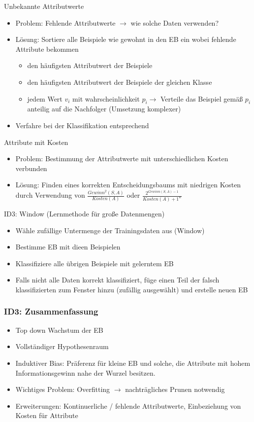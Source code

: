 \documentclass[paper=a4, fontsize=11pt]{scrartcl} %
\numberwithin{equation}{section} %
\numberwithin{figure}{section} %
\numberwithin{table}{section} %
\begin{document}
Unbekannte Attributwerte
\begin{itemize}
\item Problem: Fehlende Attributwerte $\rightarrow$ wie solche Daten verwenden?
\item Lösung: Sortiere alle Beispiele wie gewohnt in den EB ein wobei fehlende Attribute bekommen
\begin{itemize}
\item den häufigsten Attributwert der Beispiele
\item den häufigsten Attributwert der Beispiele der gleichen Klasse
\item jedem Wert $v_i$ mit wahrscheinlichkeit $p_i \rightarrow$ Verteile das Beispiel gemäß $p_i$ anteilig auf die Nachfolger (Umsetzung komplexer)
\end{itemize}
\item Verfahre bei der Klassifikation entsprechend
\end{itemize}

Attribute mit Kosten
\begin{itemize}
\item Problem: Bestimmung der Attributwerte mit unterschiedlichen Kosten verbunden
\item Lösung: Finden eines korrekten Entscheidungsbaums mit niedrigen Kosten durch Verwendung von $\frac{Gewinn^2(S,A)}{Kosten(A)}$ oder $\frac{2^{Gewinn(S,A)-1}}{Kosten(A)+1^w}$
\end{itemize}

ID3: Window (Lernmethode für große Datenmengen)
\begin{itemize}
\item Wähle zufällige Untermenge der Trainingsdaten aus (Window)
\item Bestimme EB mit dieen Beispielen
\item Klassifiziere alle übrigen Beispiele mit gelerntem EB
\item Falls nicht alle Daten korrekt klassifiziert, füge einen Teil der falsch klassifizierten zum Fenster hinzu (zufällig ausgewählt) und erstelle neuen EB
\end{itemize}

\subsubsection{ID3: Zusammenfassung}

\begin{itemize}
\item Top down Wachstum der EB
\item Vollständiger Hypothesenraum
\item Induktiver Bias: Präferenz für kleine EB und solche, die Attribute mit hohem Informationsgewinn nahe der Wurzel besitzen.
\item Wichtiges Problem: Overfitting $\rightarrow$ nachträgliches Prunen notwendig
\item Erweiterungen: Kontinuerliche / fehlende Attributwerte, Einbeziehung von Kosten für Attribute
\end{itemize}
\end{document}
